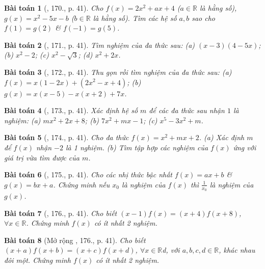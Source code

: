 \documentclass{article}
\newtheorem{baitoan}{Bài toán}
\begin{document}
\begin{baitoan}[\cite{Tuyen_Toan_7}, 170., p. 41]
	Cho $f(x) = 2x^2 + ax + 4$ ($a\in\mathbb{R}$ là hằng số), $g(x) = x^2 - 5x - b$ ($b\in\mathbb{R}$ là hằng số). Tìm các hệ số $a,b$ sao cho $f(1) = g(2)$ \& $f(-1) = g(5)$.
\end{baitoan}

\begin{baitoan}[\cite{Tuyen_Toan_7}, 171., p. 41]
	Tìm nghiệm của đa thức sau: (a) $(x - 3)(4 - 5x)$; (b) $x^2 - 2$; (c) $x^2 - \sqrt{3}$; (d) $x^2 + 2x$.
\end{baitoan}

\begin{baitoan}[\cite{Tuyen_Toan_7}, 172., p. 41]
	Thu gọn rồi tìm nghiệm của đa thức sau: (a) $f(x) = x(1 - 2x) + (2x^2 - x + 4)$; (b) $g(x) = x(x - 5) - x(x + 2) + 7x$.
\end{baitoan}

\begin{baitoan}[\cite{Tuyen_Toan_7}, 173., p. 41]
	Xác định hệ số $m$ để các đa thức sau nhận $1$ là nghiệm: (a) $mx^2 + 2x + 8$; (b) $7x^2 + mx - 1$; (c) $x^5 - 3x^2 + m$.
\end{baitoan}

\begin{baitoan}[\cite{Tuyen_Toan_7}, 174., p. 41]
	Cho đa thức $f(x) = x^2 + mx + 2$. (a) Xác định $m$ để $f(x)$ nhận $-2$ là 1 nghiệm. (b) Tìm tập hợp các nghiệm của $f(x)$ ứng với giá trị vừa tìm được của $m$.
\end{baitoan}

\begin{baitoan}[\cite{Tuyen_Toan_7}, 175., p. 41]
	Cho các nhị thức bậc nhất $f(x) = ax + b$ \& $g(x) = bx + a$. Chứng minh nếu $x_0$ là nghiệm của $f(x)$ thì $\frac{1}{x_0}$ là nghiệm của $g(x)$.
\end{baitoan}

\begin{baitoan}[\cite{Tuyen_Toan_7}, 176., p. 41]
	Cho biết $(x - 1)f(x) = (x + 4)f(x + 8)$, $\forall x\in\mathbb{R}$. Chứng minh $f(x)$ có ít nhất 2 nghiệm.
\end{baitoan}

\begin{baitoan}[Mở rộng \cite{Tuyen_Toan_7}, 176., p. 41]
	Cho biết $(x + a)f(x + b) = (x + c)f(x + d)$, $\forall x\in\mathbb{R}$d, với $a,b,c,d\in\mathbb{R}$, khác nhau đôi một. Chứng minh $f(x)$ có ít nhất 2 nghiệm.
\end{baitoan}

\end{document}
